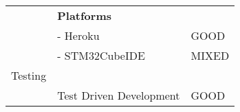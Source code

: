 \begin{table}[htbp]
\begin{center}
{\begin{tabular}{lll}
                           & \textbf{Platforms}                &                                              \\
                           & - Heroku                          & \cellcolor{green} GOOD                                         \\
                           & - STM32CubeIDE                    & \cellcolor{yellow} MIXED                                 \\
\rowcolor{grey} Testing                    &                                   &                                              \\
                           & Test Driven Development           & \cellcolor{green} GOOD                                         \\ \hline
\end{tabular}%
}
\end{center}
\end{table}

